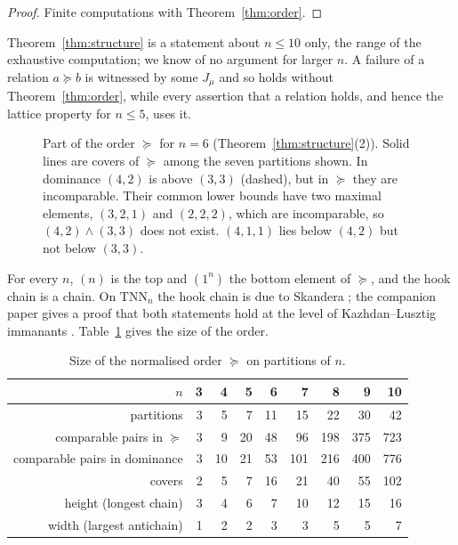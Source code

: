 \documentclass[11pt]{amsart}
\theoremstyle{definition}
\theoremstyle{remark}
\newcommand{\TNN}{\mathrm{TNN}}
\begin{document}
\begin{proof}
Finite computations with Theorem~\ref{thm:order}.
\end{proof}

Theorem~\ref{thm:structure} is a statement about $n\le10$ only, the range of the exhaustive computation; we know of no argument for larger $n$. A failure of a relation $a\succeq b$ is witnessed by some $J_\mu$ and so holds without Theorem~\ref{thm:order}, while every assertion that a relation holds, and hence the lattice property for $n\le5$, uses it.

\begin{figure}[ht]
\centering
{}
\caption{Part of the order $\succeq$ for $n=6$ (Theorem~\ref{thm:structure}(2)). Solid lines are covers of $\succeq$ among the seven partitions shown. In dominance $(4,2)$ is above $(3,3)$ (dashed), but in $\succeq$ they are incomparable. Their common lower bounds have two maximal elements, $(3,2,1)$ and $(2,2,2)$, which are incomparable, so $(4,2)\wedge(3,3)$ does not exist. $(4,1,1)$ lies below $(4,2)$ but not below $(3,3)$.}\label{fig:nolattice}
\end{figure}

For every $n$, $(n)$ is the top and $(1^n)$ the bottom element of $\succeq$, and the hook chain is a chain. On $\TNN_n$ the hook chain is due to Skandera \cite[Thm.~27]{Ska25}; the companion paper gives a proof that both statements hold at the level of Kazhdan--Lusztig immanants \cite[Prop.~6.4, Cor.~5.1]{McN}. Table~\ref{tab:structure} gives the size of the order.

\begin{table}[ht]
\small
\begin{tabular}{rrrrrrrrr}
\toprule
$n$ & 3&4&5&6&7&8&9&10\\
\midrule
partitions & 3&5&7&11&15&22&30&42\\
comparable pairs in $\succeq$ & 3&9&20&48&96&198&375&723\\
comparable pairs in dominance & 3&10&21&53&101&216&400&776\\
covers & 2&5&7&16&21&40&55&102\\
height (longest chain) & 3&4&6&7&10&12&15&16\\
width (largest antichain) & 1&2&2&3&3&5&5&7\\
\bottomrule
\end{tabular}
\caption{Size of the normalised order $\succeq$ on partitions of $n$.}\label{tab:structure}
\end{table}
\end{document}
